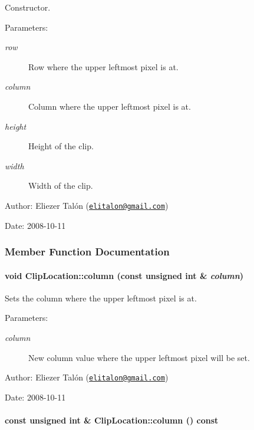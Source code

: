 Constructor. 

\begin{Desc}
\item[Parameters:]
\begin{description}
\item[{\em row}]Row where the upper leftmost pixel is at. \item[{\em column}]Column where the upper leftmost pixel is at. \item[{\em height}]Height of the clip. \item[{\em width}]Width of the clip.\end{description}
\end{Desc}
\begin{Desc}
\item[Author:]Eliezer Talón (\href{mailto:elitalon@gmail.com}{\tt elitalon@gmail.com}) \end{Desc}
\begin{Desc}
\item[Date:]2008-10-11 \end{Desc}


\subsubsection{Member Function Documentation}
\hypertarget{class_clip_location_321238ca06a98bcce5f5292c1ea3e6c0}{
\paragraph[{column}]{\setlength{\rightskip}{0pt plus 5cm}void ClipLocation::column (const unsigned int \& {\em column})}\hfill}
\label{class_clip_location_321238ca06a98bcce5f5292c1ea3e6c0}


Sets the column where the upper leftmost pixel is at. 

\begin{Desc}
\item[Parameters:]
\begin{description}
\item[{\em column}]New column value where the upper leftmost pixel will be set.\end{description}
\end{Desc}
\begin{Desc}
\item[Author:]Eliezer Talón (\href{mailto:elitalon@gmail.com}{\tt elitalon@gmail.com}) \end{Desc}
\begin{Desc}
\item[Date:]2008-10-11 \end{Desc}
\hypertarget{class_clip_location_50409bab2a256787fcc59e5d213d6a58}{
\paragraph[{column}]{\setlength{\rightskip}{0pt plus 5cm}const unsigned int \& ClipLocation::column () const}\hfill}
\label{class_clip_location_50409bab2a256787fcc59e5d213d6a58}


